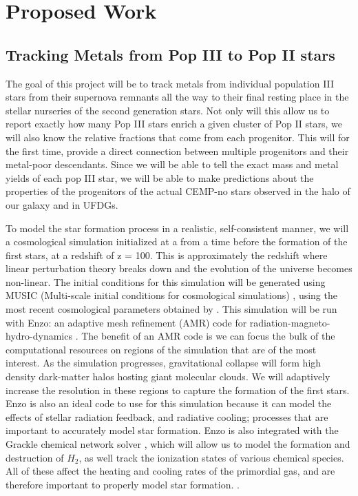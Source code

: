 \documentclass[12pt]{article}
\begin{document}
\section{Proposed Work}
\subsection{Tracking Metals from Pop III to Pop II stars}
\label{subsec:tracer_particles}
The goal of this project will be to track metals from individual population III stars from their supernova remnants all the way to their final resting place in the stellar nurseries of the second generation stars. Not only will this allow us to report exactly how many Pop III stars enrich a given cluster of Pop II stars, we will also know the relative fractions that come from each progenitor. This will for the first time, provide a direct connection between multiple progenitors and their metal-poor descendants. Since we will be able to tell the exact mass and metal yields of each pop III star, we will be able to make predictions about the properties of the progenitors of the actual CEMP-no stars observed in the halo of our galaxy and in UFDGs. 

To model the star formation process in a realistic, self-consistent manner, we will a cosmological simulation initialized at a from a time before the formation of the first stars, at a redshift of z = 100. This is approximately the redshift where linear perturbation theory breaks down and the evolution of the universe becomes non-linear. The initial conditions for this simulation will be generated using MUSIC (Multi-scale initial conditions for cosmological simulations) \citep{...}, using the most recent cosmological parameters obtained by \cite{Plank2018}. This simulation will be run with Enzo: an adaptive mesh refinement (AMR) code for radiation-magneto-hydro-dynamics \citep{...}. The benefit of an AMR code is we can focus the bulk of the computational resources on regions of the simulation that are of the most interest. As the simulation progresses, gravitational collapse will form high density dark-matter halos hosting giant molecular clouds. We will adaptively increase the resolution in these regions to capture the formation of the first stars. Enzo is also an ideal code to use for this simulation because it can model the effects of stellar radiation feedback, and radiative cooling; processes that are important to accurately model star formation. Enzo is also integrated with the Grackle chemical network solver \citep{...}, which will allow us to model the formation and destruction of $H_2$, as well track the ionization states of various chemical species. All of these affect the heating and cooling rates of the primordial gas, and are therefore important to properly model star formation. \cite{}.
\end{document}
